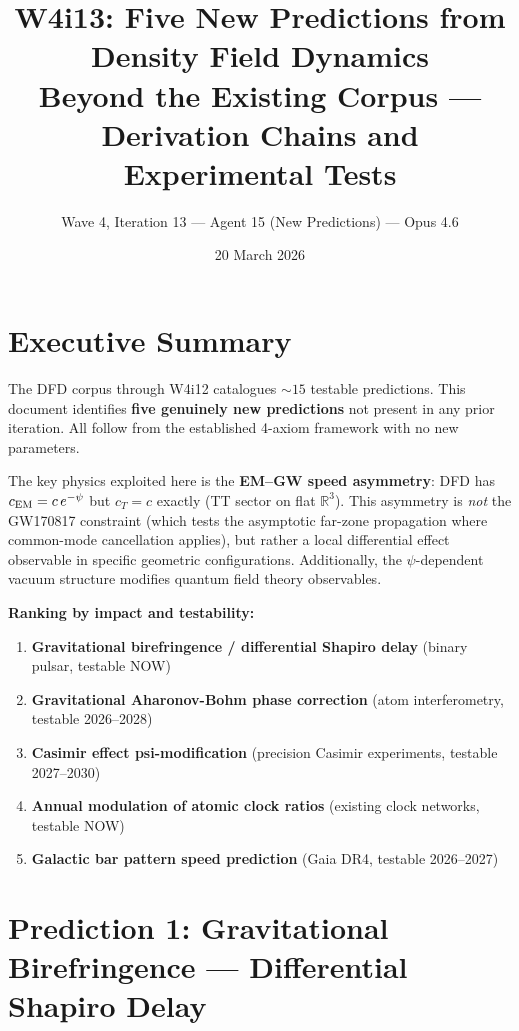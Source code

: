 \documentclass[11pt]{article}
\title{W4i13: Five New Predictions from Density Field Dynamics\\
\large Beyond the Existing Corpus --- Derivation Chains and Experimental Tests}
\author{Wave 4, Iteration 13 --- Agent 15 (New Predictions) --- Opus 4.6}
\date{20 March 2026}
\begin{document}
\maketitle

\section*{Executive Summary}

The DFD corpus through W4i12 catalogues $\sim 15$ testable predictions. This document
identifies \textbf{five genuinely new predictions} not present in any prior iteration.
All follow from the established 4-axiom framework with no new parameters.

The key physics exploited here is the \textbf{EM--GW speed asymmetry}: DFD has
$c_{\rm EM} = c\,e^{-\psi}$ but $c_T = c$ exactly (TT sector on flat $\mathbb{R}^3$).
This asymmetry is \emph{not} the GW170817 constraint (which tests the asymptotic
far-zone propagation where common-mode cancellation applies), but rather a local
differential effect observable in specific geometric configurations. Additionally,
the $\psi$-dependent vacuum structure modifies quantum field theory observables.

\bigskip
\noindent\textbf{Ranking by impact and testability:}
\begin{enumerate}
\item \textbf{Gravitational birefringence / differential Shapiro delay} (binary pulsar, testable NOW)
\item \textbf{Gravitational Aharonov-Bohm phase correction} (atom interferometry, testable 2026--2028)
\item \textbf{Casimir effect psi-modification} (precision Casimir experiments, testable 2027--2030)
\item \textbf{Annual modulation of atomic clock ratios} (existing clock networks, testable NOW)
\item \textbf{Galactic bar pattern speed prediction} (Gaia DR4, testable 2026--2027)
\end{enumerate}

\section{Prediction 1: Gravitational Birefringence --- Differential Shapiro Delay}
\label{sec:birefringence}
\end{document}
